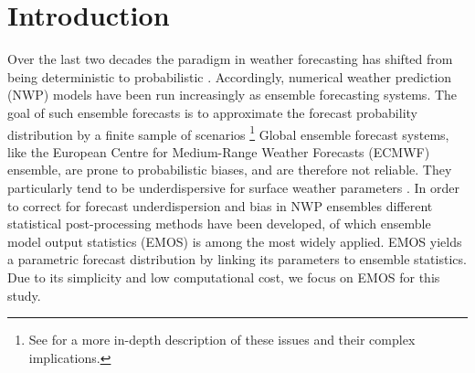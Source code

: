 %
%
%


\section{Introduction}
\label{sec:intro}
Over the last two decades the paradigm in weather forecasting has
shifted from being deterministic to probabilistic \citep[see
e.g.][]{Palm00,Hami00}. Accordingly, numerical weather prediction
(NWP) models have been run increasingly as ensemble forecasting
systems. The goal of such ensemble forecasts is to approximate the
forecast probability distribution by a finite sample of scenarios
\citet{Leit74}\footnote{See \citet{Leit74} for a more in-depth
description of these issues and their complex implications.}
Global ensemble forecast systems, like the European
Centre for Medium-Range Weather Forecasts (ECMWF) ensemble, are prone
to probabilistic biases, and are therefore not reliable. They
particularly tend to be underdispersive for surface weather parameters
\citet{Boug10, Park08}. In order to correct for forecast
underdispersion and bias in NWP ensembles different
statistical
post-processing methods have been developed, of which ensemble model
output statistics (EMOS) \citep{Gneit05} is among the most widely
applied. EMOS yields a parametric forecast distribution by linking its
parameters to ensemble statistics. Due to its simplicity and low
computational cost, we focus on EMOS for this study.



